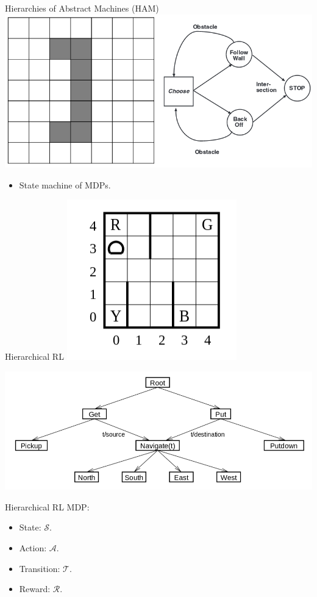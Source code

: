 Hierarchies of Abstract Machines (HAM)
\includegraphics[width=0.8\columnwidth]{ham.png}
\begin{itemize}
  \item State machine of MDPs.
\end{itemize}



Hierarchical RL
\includegraphics[width=0.4\columnwidth]{taxi.png}

\includegraphics[width=0.8\columnwidth]{maxq.png}



Hierarchical RL
MDP:
\begin{itemize}
  \item State: {\color{red}$\mathcal{S}$}.
  \item Action: {\color{red}$\mathcal{A}$}.
  \item Transition: {\color{red}$\mathcal{T}$}.
  \item Reward: {\color{red}$\mathcal{R}$}.
\end{itemize}



